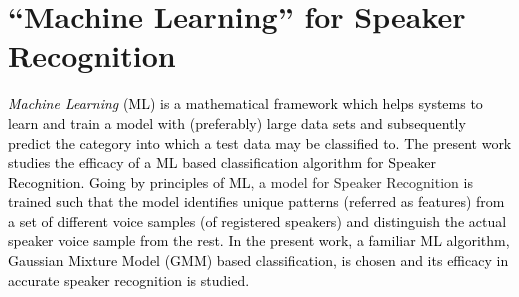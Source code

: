 \documentclass{article}
\begin{document}
\section{\textbf{{``Machine Learning'' for Speaker Recognition}}}
 \textcolor{black}{\textit{Machine Learning} (ML) is a mathematical framework which helps systems to learn and train a model with (preferably) large data sets and subsequently predict the category into which a test data may be classified to.} 
 \textcolor{black}{The present work studies the efficacy of a ML based classification algorithm for Speaker Recognition. Going by principles of ML}, a model for Speaker Recognition \textcolor{black}{is trained such that the model identifies unique patterns (referred as features) from a set of different voice samples (of registered speakers) and distinguish the actual speaker voice sample from the rest. In the present work, a familiar ML algorithm, Gaussian Mixture Model (GMM) based classification, is chosen and its efficacy in accurate speaker recognition is studied.}
\end{document}
